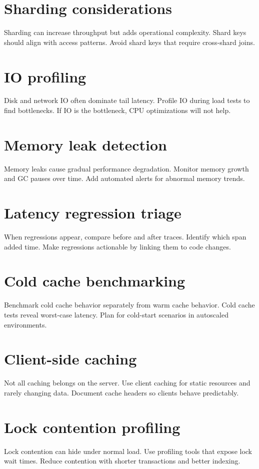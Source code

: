 \section{Sharding considerations}
Sharding can increase throughput but adds operational complexity.
Shard keys should align with access patterns.
Avoid shard keys that require cross-shard joins.

\section{IO profiling}
Disk and network IO often dominate tail latency.
Profile IO during load tests to find bottlenecks.
If IO is the bottleneck, CPU optimizations will not help.

\section{Memory leak detection}
Memory leaks cause gradual performance degradation.
Monitor memory growth and GC pauses over time.
Add automated alerts for abnormal memory trends.

\section{Latency regression triage}
When regressions appear, compare before and after traces.
Identify which span added time.
Make regressions actionable by linking them to code changes.

\section{Cold cache benchmarking}
Benchmark cold cache behavior separately from warm cache behavior.
Cold cache tests reveal worst-case latency.
Plan for cold-start scenarios in autoscaled environments.

\section{Client-side caching}
Not all caching belongs on the server.
Use client caching for static resources and rarely changing data.
Document cache headers so clients behave predictably.

\section{Lock contention profiling}
Lock contention can hide under normal load.
Use profiling tools that expose lock wait times.
Reduce contention with shorter transactions and better indexing.

